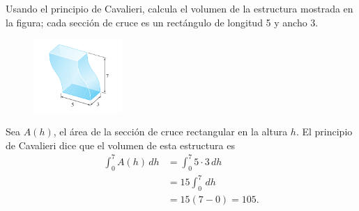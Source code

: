 Usando el principio de Cavalieri, calcula el volumen de la estructura mostrada
en la figura; cada sección de cruce es un rectángulo de longitud 5 y ancho 3.
\begin{figure}[H]
    \begin{center}
        \includegraphics[width=0.3\textwidth]{img/Ej2/ej6.png}
    \end{center}
\end{figure}
\begin{solution}
    Sea $A(h)$, el área de la sección de cruce rectangular en la altura $h$. El principio 
    de Cavalieri dice que 
    el volumen de esta estructura es
    \begin{align*}
        \int_{0}^7 A(h) \, dh
        &=
        \int_{0}^7 5\cdot 3 \, dh\\
        &=
        15 \int_0^7 \, dh\\
        &=
        15 (7-0)=105.
    \end{align*}
\end{solution}
